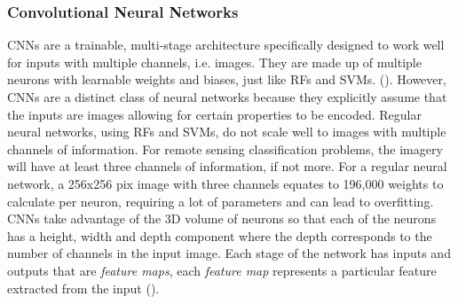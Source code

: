 \subsubsection{Convolutional Neural Networks}
CNNs are a trainable, multi-stage architecture specifically designed to work well for inputs with multiple channels, i.e. images. They are made up of multiple neurons with learnable weights and biases, just like RFs and SVMs.  (\cite{Karpathy1}). However, CNNs are a distinct class of neural networks because they explicitly assume that the inputs are images allowing for certain properties to be encoded. Regular neural networks, using RFs and SVMs, do not scale well to images with multiple channels of information. For remote sensing classification problems, the imagery will have at least three channels of information, if not more. For a regular neural network, a 256x256 pix image with three channels equates to 196,000 weights to calculate per neuron, requiring a lot of parameters and can lead to overfitting. CNNs take advantage of the 3D volume of neurons so that each of the neurons has a height, width and depth component where the depth corresponds to the number of channels in the input image. Each stage of the network has inputs and outputs that are \textit{feature maps}, each \textit{feature map} represents a particular feature extracted from the input (\cite{lecun10}).

